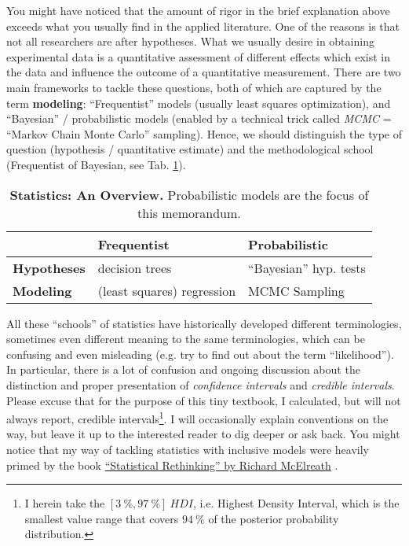 You might have noticed that the amount of rigor in the brief explanation above exceeds what you usually find in the applied literature.
One of the reasons is that not all researchers are after hypotheses.
What we usually desire in obtaining experimental data is a quantitative assessment of different effects which exist in the data and influence the outcome of a quantitative measurement.
There are two main frameworks to tackle these questions, both of which are captured by the term \textbf{modeling}: ``Frequentist'' models (usually least squares optimization), and ``Bayesian'' / probabilistic models (enabled by a technical trick called \emph{MCMC} = ``Markov Chain Monte Carlo'' sampling).
Hence, we should distinguish the type of question (hypothesis / quantitative estimate) and the methodological school (Frequentist of Bayesian, see Tab. \ref{tab:statistics}).

\begin{table}[p]
\caption{\label{tab:statistics}\textbf{Statistics: An Overview.} Probabilistic models are the focus of this memorandum.}
\centering
\begin{tabular}{|l|l|l|}
\hline
 & \textbf{Frequentist} & \textbf{Probabilistic}\\[0pt]
\hline
\textbf{Hypotheses} & decision trees & ``Bayesian'' hyp. tests\\[0pt]
\hline
\textbf{Modeling} & (least squares) regression & MCMC Sampling\\[0pt]
\hline
\end{tabular}
\end{table}



All these ``schools'' of statistics have historically developed different terminologies, sometimes even different meaning to the same terminologies, which can be confusing and even misleading (e.g. try to find out about the term ``likelihood'').
In particular, there is a lot of confusion and ongoing discussion about the distinction and proper presentation of \emph{confidence intervals} and \emph{credible intervals}.
Please excuse that for the purpose of this tiny textbook, I calculated, but will not always report, credible intervals\footnote{I herein take the $\left[3\ \%,97\ \%\right]\ HDI$, i.e. Highest Density Interval, which is the smallest value range that covers $94\ \%$ of the posterior probability distribution.}.
I will occasionally explain conventions on the way, but leave it up to the interested reader to dig deeper or ask back.
You might notice that my way of tackling statistics with inclusive models were heavily primed by the book \href{https://xcelab.net/rm/statistical-rethinking/}{``Statistical Rethinking'' by Richard McElreath} \citep{McElreath2018}.


